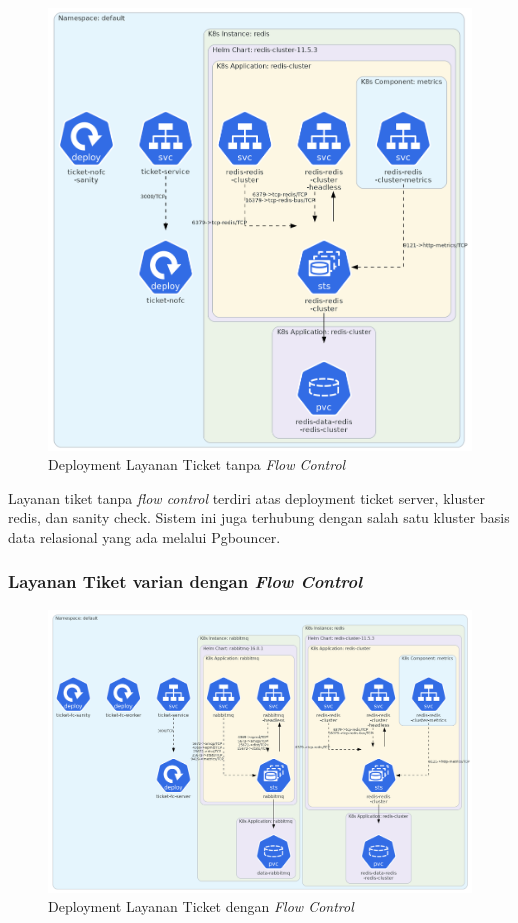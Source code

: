 \begin{figure}[htbp]
    \centering
    \includegraphics[width=1\textwidth]{resources/chapter-4/ticket-nofc.png}
    \caption{Deployment Layanan Ticket tanpa \textit{Flow Control}}
    \label{fig:deployment-ticket-nofc}
\end{figure}

Layanan tiket tanpa \textit{flow control} terdiri atas deployment ticket server, kluster redis, dan sanity check. Sistem ini juga terhubung dengan salah satu kluster basis data relasional yang ada melalui Pgbouncer.

\pagebreak

\subsubsection{Layanan Tiket varian dengan \textit{Flow Control}}

\begin{figure}[htbp]
    \centering
    \includegraphics[width=1\textwidth]{resources/chapter-4/ticket-fc.png}
    \caption{Deployment Layanan Ticket dengan \textit{Flow Control}}
    \label{fig:deployment-ticket-fc}
\end{figure}


